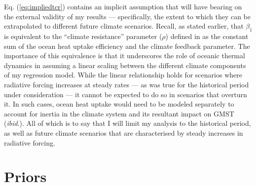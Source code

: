 \documentclass[smallextended]{svjour3}       %
\begin{document}
Eq. (\ref{eq:impliedtcr}) contains an implicit assumption that will have
bearing on the external validity of my results --- specifically, the
extent to which they can be extrapolated to different future climate
scenarios. Recall, as stated earlier, that \(\beta_1\) is equivalent to
the ``climate resistance'' parameter (\(\rho\)) defined in
\cite{gregory2008transient} as the constant sum of the ocean heat uptake
efficiency and the climate feedback parameter. The importance of this
equivalence is that it underscores the role of oceanic thermal dynamics
in assuming a linear scaling between the different climate components of
my regression model. While the linear relationship holds for scenarios
where radiative forcing increases at steady rates --- as was true for
the historical period under consideration --- it cannot be expected to
do so in scenarios that overturn it. In such cases, ocean heat uptake
would need to be modeled separately to account for inertia in the
climate system and its resultant impact on GMST (\emph{ibid}.). All of
which is to say that I will limit my analysis to the historical period,
as well as future climate scenarios that are characterised by steady
increases in radiative forcing.

\hypertarget{sec:priors}{%
\section{Priors}\label{sec:priors}}
\end{document}
